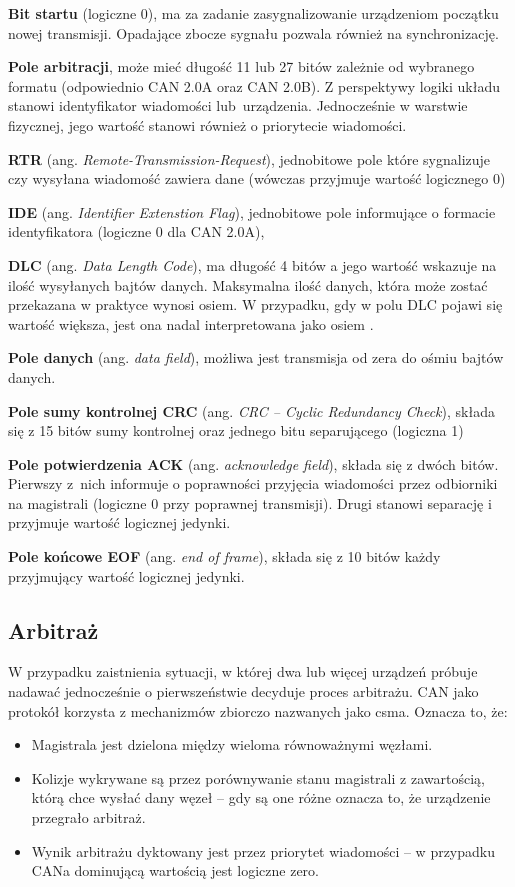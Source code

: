 \textbf{Bit startu }(logiczne 0), ma za zadanie zasygnalizowanie urządzeniom początku nowej transmisji. Opadające zbocze sygnału pozwala również na synchronizację.

\textbf{Pole arbitracji}, może mieć długość 11 lub 27 bitów zależnie od wybranego formatu (odpowiednio CAN 2.0A oraz CAN 2.0B). Z perspektywy logiki układu stanowi identyfikator wiadomości lub~urządzenia. Jednocześnie w warstwie fizycznej, jego wartość stanowi również o priorytecie wiadomości. 

\textbf{RTR} (ang. \textit{Remote-Transmission-Request}), jednobitowe pole które sygnalizuje czy wysyłana wiadomość zawiera dane (wówczas przyjmuje wartość logicznego 0)

\textbf{IDE} (ang. \textit{Identifier Extenstion Flag}), jednobitowe pole informujące o formacie identyfikatora (logiczne 0 dla CAN 2.0A),

\textbf{DLC} (ang. \textit{Data Length Code}), ma długość 4 bitów a jego wartość wskazuje na ilość wysyłanych bajtów danych. Maksymalna ilość danych, która może zostać przekazana w praktyce wynosi osiem. W przypadku, gdy w polu DLC pojawi się wartość większa, jest ona nadal interpretowana jako osiem \cite{can_spec}.

\textbf{Pole danych} (ang. \textit{data field}), możliwa jest transmisja od zera do ośmiu bajtów danych.

\textbf{Pole sumy kontrolnej CRC} (ang. \textit{CRC -- Cyclic Redundancy Check}), składa się z 15 bitów sumy kontrolnej oraz jednego bitu separującego (logiczna 1)

\textbf{Pole potwierdzenia ACK} (ang. \textit{acknowledge field}), składa się z dwóch bitów. Pierwszy z~nich informuje o poprawności przyjęcia wiadomości przez odbiorniki na magistrali (logiczne 0 przy poprawnej transmisji). Drugi stanowi separację i przyjmuje wartość logicznej jedynki.

\textbf{Pole końcowe EOF} (ang. \textit{end of frame}), składa się z 10 bitów każdy przyjmujący wartość logicznej jedynki.

\subsection{Arbitraż}
W przypadku zaistnienia sytuacji, w której dwa lub więcej urządzeń próbuje nadawać jednocześnie o pierwszeństwie decyduje proces arbitrażu. CAN jako protokół korzysta z mechanizmów zbiorczo nazwanych jako \gls{csma}. Oznacza to, że:
    \begin{itemize}
        \item Magistrala jest dzielona między wieloma równoważnymi węzłami.
        \item Kolizje wykrywane są przez porównywanie stanu magistrali z zawartością, którą chce wysłać dany węzeł -- gdy są one różne oznacza to, że urządzenie przegrało arbitraż.
        \item Wynik arbitrażu dyktowany jest przez priorytet wiadomości -- w przypadku CANa dominującą wartością jest logiczne zero.
    \end{itemize}

